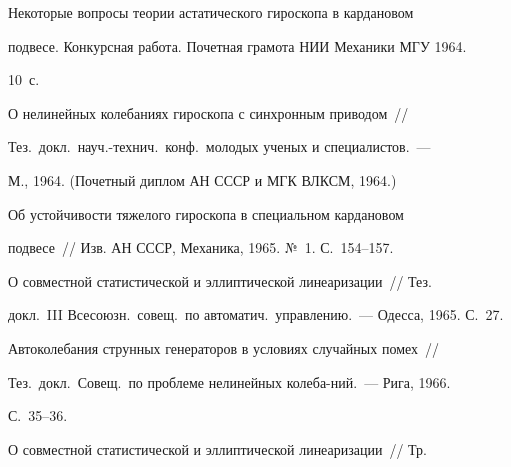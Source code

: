 




 Некоторые вопросы теории астатического гироскопа в кардановом


подвесе. Конкурсная работа. Почетная грамота НИИ Механики МГУ 1964.


10~с.





 О нелинейных колебаниях гироскопа с синхронным приводом~//


Тез.\ докл.\ науч.-технич.\ конф.\ молодых ученых и специалистов.~---


М., 1964. (Почетный диплом АН СССР и МГК ВЛКСМ, 1964.)


\vspace*{-6pt}










 Об устойчивости тяжелого гироскопа в специальном кардановом


подвесе~// Изв. АН СССР, Механика, 1965. №\, 1. С.~154--157.





 О совместной статистической и эллиптической линеаризации~// Тез.\


докл.\ III Всесоюзн.\ совещ.\ по автоматич.\ управлению.~--- Одесса, 1965. С.~27.


\vspace*{-3pt}










 Автоколебания струнных генераторов в условиях случайных помех~//


Тез.\ докл.\ Совещ.\ по проблеме нелинейных колеба-\linebreak ний.~--- Рига, 1966.


 С.~35--36.










 О совместной статистической и эллиптической линеаризации~// Тр.\



